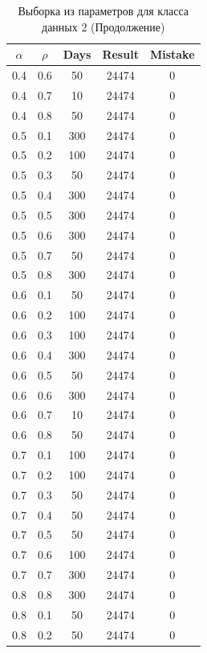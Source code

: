 \clearpage

\begin{center}
	\captionsetup{justification=raggedright,singlelinecheck=off}
	\begin{longtable}[c]{|c|c|c|c|c|}
		\caption{Выборка из параметров для класса данных 2 (Продолжение)\label{tbl:table_kd2-2}}\\ \hline
		$\alpha$ & $\rho$ & Days & Result & Mistake \\ \hline
		0.4 & 0.6 &  50 &   24474 &    0 \\
		0.4 & 0.7 &  10 &   24474 &    0 \\	
		0.4 & 0.8 &  50 &  24474 &    0 \\ \hline
		0.5 & 0.1 &  300 &   24474 &    0 \\
		0.5 & 0.2 &  100 &   24474 &    0 \\
		0.5 & 0.3 &  50 &   24474 &    0 \\
		0.5 & 0.4 &  300 &   24474 &    0 \\
		0.5 & 0.5 &  300 &   24474 &    0 \\
		0.5 & 0.6 &  300 &   24474 &    0 \\
		0.5 & 0.7 &  50 &   24474 &    0 \\
		0.5 & 0.8 &  300 &  24474 &    0 \\ \hline
		0.6 & 0.1 & 50 &   24474 &    0 \\
		0.6 & 0.2 & 100 &   24474 &    0 \\
		0.6 & 0.3 & 100 &   24474 &    0 \\
		0.6 & 0.4 & 300 &   24474 &    0 \\
		0.6 & 0.5 & 50 &   24474 &    0 \\
		0.6 & 0.6 & 300 &   24474 &    0 \\
		0.6 & 0.7 & 10 &   24474 &    0 \\
		0.6 & 0.8 & 50 &  24474 &    0 \\ \hline
		0.7 & 0.1 & 100 &   24474 &    0 \\
		0.7 & 0.2 & 100 &   24474 &    0 \\
		0.7 & 0.3 & 50 &   24474 &    0 \\
		0.7 & 0.4 & 50 &   24474 &    0 \\
		0.7 & 0.5 & 50 &   24474 &    0 \\
		0.7 & 0.6 & 100 &   24474 &    0 \\
		0.7 & 0.7 & 300 &   24474 &    0 \\
		0.8 & 0.8 & 300 &  24474 &    0 \\ \hline
		0.8 & 0.1 & 50 &   24474 &    0 \\
		0.8 & 0.2 & 50 &   24474 &    0 \\ \hline
		
	\end{longtable}
\end{center}


